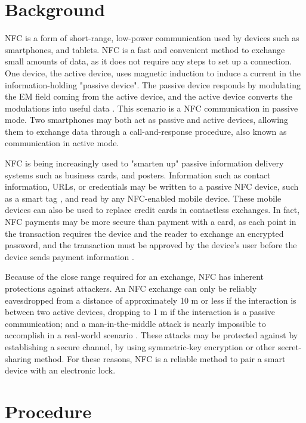 \documentclass{article}
\begin{document}
\section{Background}

NFC is a form of short-range, low-power communication used by devices such as smartphones, and tablets. NFC is a fast and convenient method to exchange small amounts of data, as it does not require any steps to set up a connection. One device, the active device, uses magnetic induction to induce a current in the information-holding "passive device". The passive device responds by modulating the EM field coming from the active device, and the active device converts the modulations into useful data \cite{NFCORG}. This scenario is a NFC communication in passive mode. Two smartphones may both act as passive and active devices, allowing them to exchange data through a call-and-response procedure, also known as communication in active mode.

NFC is being increasingly used to "smarten up" passive information delivery systems such as business cards, and posters. Information such as contact information, URLs, or credentials may be written to a passive NFC device, such as a smart tag \cite{NFCFORUMWHATIS}, and read by any NFC-enabled mobile device. These mobile devices can also be used to replace credit cards in contactless exchanges. In fact, NFC payments may be more secure than payment with a card, as each point in the transaction requires the device and the reader to exchange an encrypted password, and the transaction must be approved by the device's user before the device sends payment information \cite{NFCPAYMENT}.

Because of the close range required for an exchange, NFC has inherent protections against attackers. An NFC exchange can only be reliably eavesdropped from a distance of approximately 10 m or less if the interaction is between two active devices, dropping to 1 m if the interaction is a passive communication; and a man-in-the-middle attack is nearly impossible to accomplish in a real-world scenario \cite{NFCSECURITY}. These attacks may be protected against by establishing a secure channel, by using symmetric-key encryption or other secret-sharing method. For these reasons, NFC is a reliable method to pair a smart device with an electronic lock.

\section{Procedure}
\end{document}
